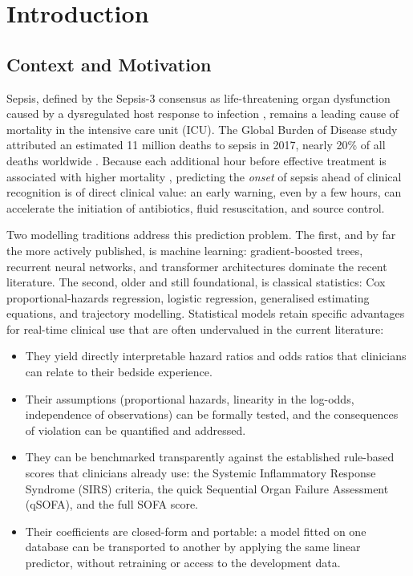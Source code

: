 \chapter{Introduction}
\label{ch:introduction}

\section{Context and Motivation}
Sepsis, defined by the Sepsis-3 consensus as life-threatening organ dysfunction
caused by a dysregulated host response to infection \cite{singer2016sepsis3},
remains a leading cause of mortality in the intensive care unit (ICU). The
Global Burden of Disease study attributed an estimated 11 million deaths to
sepsis in 2017, nearly 20\% of all deaths worldwide
\cite{rudd2020global}. Because each additional hour before effective treatment
is associated with higher mortality \cite{seymour2017time}, predicting the
\emph{onset} of sepsis ahead of clinical recognition is of direct clinical
value: an early warning, even by a few hours, can accelerate the initiation of
antibiotics, fluid resuscitation, and source control.

Two modelling traditions address this prediction problem. The first, and by far
the more actively published, is machine learning: gradient-boosted trees,
recurrent neural networks, and transformer architectures dominate the recent
literature. The second, older and still foundational, is classical statistics:
Cox proportional-hazards regression, logistic regression, generalised estimating
equations, and trajectory modelling. Statistical models retain specific
advantages for real-time clinical use that are often undervalued in the current
literature:

\begin{itemize}
  \item They yield directly interpretable hazard ratios and odds ratios that
  clinicians can relate to their bedside experience.
  \item Their assumptions (proportional hazards, linearity in the log-odds,
  independence of observations) can be formally tested, and the consequences of
  violation can be quantified and addressed.
  \item They can be benchmarked transparently against the established rule-based
  scores that clinicians already use: the Systemic Inflammatory Response
  Syndrome (SIRS) criteria, the quick Sequential Organ Failure Assessment
  (qSOFA), and the full SOFA score.
  \item Their coefficients are closed-form and portable: a model fitted on one
  database can be transported to another by applying the same linear predictor,
  without retraining or access to the development data.
\end{itemize}

